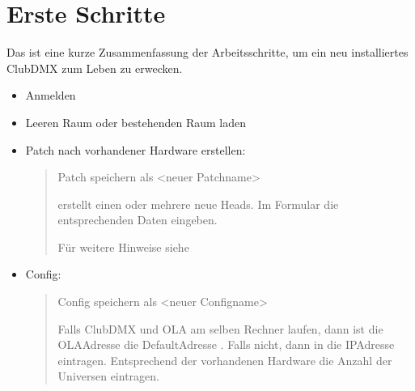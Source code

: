 \documentclass[letterpaper,10pt,ngerman]{sphinxmanual}
\begin{document}
\chapter{Erste Schritte}
\label{\detokenize{erste_schritte:erste-schritte}}\label{\detokenize{erste_schritte:erste-schritte-label}}\label{\detokenize{erste_schritte::doc}}
Das ist eine kurze Zusammenfassung der Arbeitsschritte, um ein neu
installiertes ClubDMX zum Leben zu erwecken.
\begin{itemize}
\item {} 
Anmelden

\item {} \begin{description}
\item[{Leeren Raum oder bestehenden Raum laden}] \leavevmode
{}

\end{description}

\item {} 
Patch nach vorhandener Hardware erstellen:
\begin{quote}

Patch  speichern als \textless{}neuer Patchname\textgreater{}

 erstellt einen oder mehrere neue Heads.
Im Formular die entsprechenden Daten eingeben.

Für weitere Hinweise siehe {\hyperref[\detokenize{patch:neupatchlabel}]{}}
\end{quote}

\item {} 
Config:
\begin{quote}

Config  speichern als \textless{}neuer Configname\textgreater{}

Falls ClubDMX und OLA am selben Rechner laufen, dann ist die OLA\sphinxhyphen{}Adresse die
Default\sphinxhyphen{}Adresse . Falls nicht, dann
in  die IP\sphinxhyphen{}Adresse
eintragen. Entsprechend der vorhandenen Hardware die Anzahl der
Universen eintragen.
\end{quote}


\end{itemize}
\end{document}
